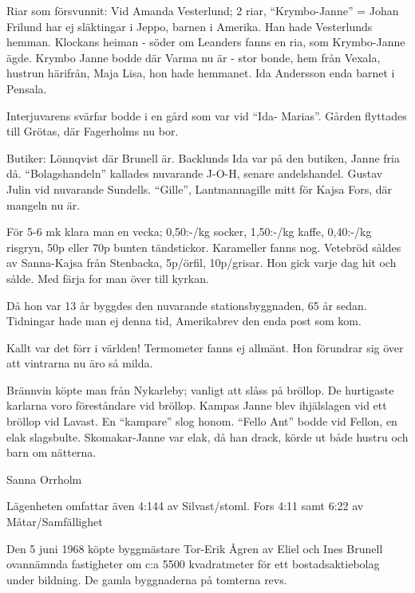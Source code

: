 Riar som försvunnit: Vid Amanda Vesterlund; 2 riar,  ``Krymbo-Janne'' = Johan Frilund har ej släktingar i Jeppo, barnen i Amerika. Han hade Vesterlunds hemman. Klockans heiman - söder om Leanders fanns en ria, som Krymbo-Janne ägde. Krymbo Janne bodde där Varma nu är - stor bonde, hem från Vexala, hustrun härifrån, Maja Lisa, hon hade hemmanet. Ida Andersson enda barnet i Pensala.

Interjuvarens svärfar bodde i en gård som var vid ``Ida- Marias''. Gården flyttades till Grötas, där Fagerholms nu bor.

Butiker: Lönnqvist där Brunell är. Backlunds Ida var på den butiken, Janne fria då. ``Bolagshandeln'' kallades nuvarande J-O-H, senare andelshandel. Gustav Julin vid nuvarande Sundells.  ``Gille'', Lantmannagille mitt för Kajsa Fors, där mangeln nu är.

För 5-6 mk klara man en vecka; 0,50:-/kg socker, 1,50:-/kg kaffe, 0,40:-/kg risgryn, 50p eller 70p bunten tändstickor.  Karameller fanns nog. Vetebröd såldes av Sanna-Kajsa från Stenbacka, 5p/örfil, 10p/grisar. Hon gick varje dag hit och sålde. Med färja for man över till kyrkan.

Då hon var 13 år byggdes den nuvarande stationsbyggnaden, 65 år sedan. Tidningar hade man ej denna tid, Amerikabrev den enda post som kom.

Kallt var det förr i världen! Termometer fanns ej allmänt. Hon förundrar sig över att vintrarna nu äro så milda.

Brännvin köpte man från Nykarleby; vanligt att slåss på bröllop. De hurtigaste karlarna voro föreståndare vid bröllop. Kampas Janne blev ihjälslagen vid ett bröllop vid Lavast. En ``kampare'' slog honom. ``Fello Ant''  bodde vid Fellon, en elak slagsbulte. Skomakar-Janne var elak, då han drack, körde ut både hustru och barn om nätterna.

Sanna Orrholm




Lägenheten omfattar även  4:144 av Silvast/stoml. Fors 4:11	samt  6:22 av Måtar/Samfällighet



Den 5 juni 1968 köpte byggmästare Tor-Erik Ågren av Eliel och Ines Brunell ovannämnda fastigheter om c:a 5500 kvadratmeter för ett bostadsaktiebolag under bildning. De gamla byggnaderna på tomterna revs.

